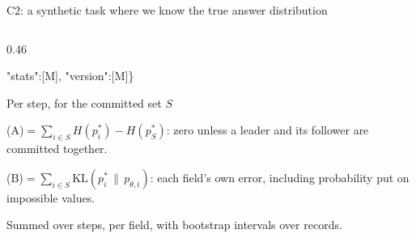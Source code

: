 \documentclass[aspectratio=169,10pt,t]{beamer}
\newcommand{\A}{{\color{dep}\firasemibold (A)}\xspace}
\newcommand{\B}{{\color{est}\firasemibold (B)}\xspace}
\newcommand{\paneltitle}[1]{{\color{accentdark}\small\firasemibold #1}\par\vspace{0.8mm}}
\begin{document}
\begin{frame}{C2: a synthetic task where we know the true answer distribution}
\begin{columns}[T,onlytextwidth]
\begin{column}{0.46\textwidth}
\begin{panel}[colback=plane, colframe=plane]
        \hspace*{2mm}"stats":{\color{muted}[M]}, "version":{\color{muted}[M]}\}
      \end{panel}
      \vspace{1.5mm}
      \begin{panel}
        \paneltitle{Per step, for the committed set $S$}
        \A $= \sum_{i\in S} H(p^{*}_i) - H(p^{*}_S)$: zero unless a leader and its follower
        are committed together.\par\vspace{0.6mm}
        \B $= \sum_{i\in S}\mathrm{KL}(p^{*}_i \,\|\, p_{\theta,i})$: each field's own error,
        including probability put on impossible values.\par\vspace{0.6mm}
        Summed over steps, per field, with bootstrap intervals over records.
      \end{panel}
    \end{column}
  \end{columns}
\end{frame}
\end{document}
